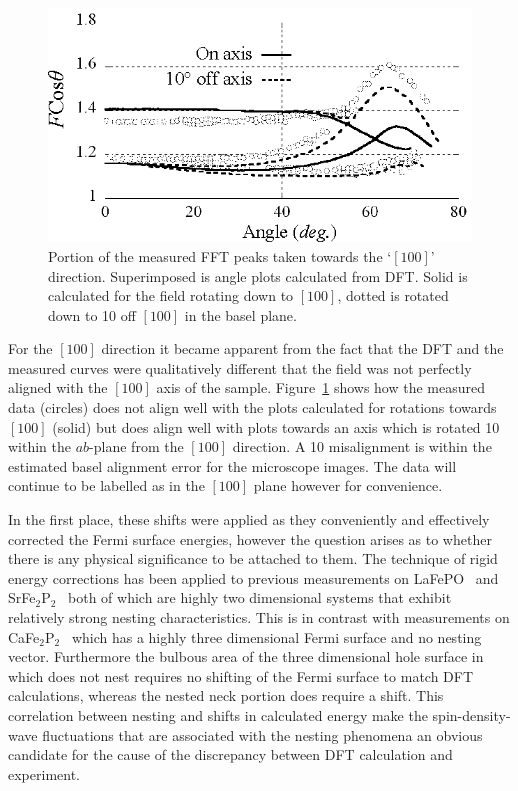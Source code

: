 \begin{figure}[htbp]
    \begin{center}
        \includegraphics[scale=0.9]{Chapter-dHvABaFe2P2/Figures/AngleDepMeasurements/BaselMisalignment/BaselMisalignment}
        \caption{Portion of the measured \ac{FFT} peaks taken towards the `$[100]$' direction. Superimposed is angle plots calculated from \ac{DFT}. Solid is calculated for the field rotating down to $[100]$, dotted is rotated down to \unit{10}{\degree} off $[100]$ in the basel plane.}
        \label{Fig:ResD:BaselMisalignment}
    \end{center}
\end{figure}
For the $[100]$ direction it became apparent from the fact that the \ac{DFT} and the measured curves were qualitatively different that the field was not perfectly aligned with the $[100]$ axis of the sample. Figure~\ref{Fig:ResD:BaselMisalignment} shows how the measured data (circles) does not align well with the plots calculated for rotations towards $[100]$ (solid) but does align well with plots towards an axis which is rotated \unit{10}{\degree} within the $ab$-plane from the $[100]$ direction. A \unit{10}{\degree} misalignment is within the estimated basel alignment error for the microscope images. The data will continue to be labelled as in the $[100]$ plane however for convenience.

In the first place, these shifts were applied as they conveniently and effectively corrected the Fermi surface energies, however the question arises as to whether there is any physical significance to be attached to them. The technique of rigid energy corrections has been applied to previous measurements on LaFePO~\cite{Carrington2009} and SrFe$_2$P$_2$~\cite{Analytis2009} both of which are highly two dimensional systems that exhibit relatively strong nesting characteristics. This is in contrast with measurements on CaFe$_2$P$_2$~\cite{Coldea2009} which has a highly three dimensional Fermi surface and no nesting vector. Furthermore the bulbous area of the three dimensional hole surface in \BaFeP which does not nest requires no shifting of the Fermi surface to match \ac{DFT} calculations, whereas the nested neck portion does require a shift. This correlation between nesting and shifts in calculated energy make the spin-density-wave fluctuations that are associated with the nesting phenomena an obvious candidate for the cause of the discrepancy between \ac{DFT} calculation and experiment.


